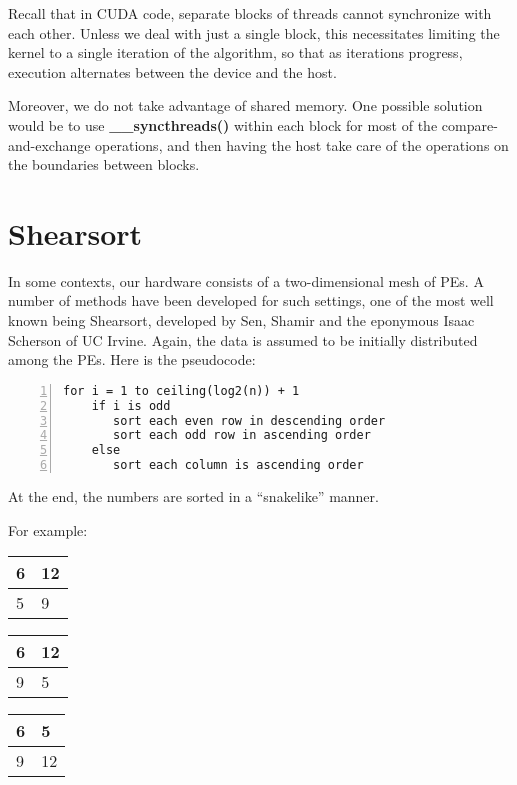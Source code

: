 Recall that in CUDA code, separate blocks of threads cannot
synchronize with each other.  Unless we deal with just a single block,
this necessitates limiting the kernel to a single iteration of the
algorithm, so that as iterations progress, execution alternates between
the device and the host.  

Moreover, we do not take advantage of shared memory.  One possible
solution would be to use {\bf \_\_syncthreads()} within each block for
most of the compare-and-exchange operations, and then having the host
take care of the operations on the boundaries between blocks.

\section{Shearsort}

In some contexts, our hardware consists of a two-dimensional mesh of
PEs.  A number of methods have been developed for such settings, one of
the most well known being Shearsort, developed by Sen, Shamir and the
eponymous Isaac Scherson of UC Irvine.  Again, the data is assumed to be
initially distributed among the PEs.  Here is the pseudocode:

\begin{Verbatim}[fontsize=\relsize{-2},numbers=left]
for i = 1 to ceiling(log2(n)) + 1
    if i is odd
       sort each even row in descending order
       sort each odd row in ascending order
    else
       sort each column is ascending order
\end{Verbatim}

At the end, the numbers are sorted in a ``snakelike'' manner.

For example:

\begin{tabular}{|l|l|}
\hline
6 & 12 \\ \hline 
5 & 9 \\ \hline 
\end{tabular}

\begin{tabular}{|l|l|}
\hline
6 & 12 \\ \hline 
9 & 5 \\ \hline 
\end{tabular}

\begin{tabular}{|l|l|}
\hline
6 & 5 \\ \hline 
9 & 12 \\ \hline 
\end{tabular}

